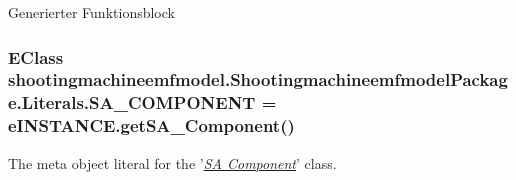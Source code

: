 Generierter Funktionsblock \hypertarget{interfaceshootingmachineemfmodel_1_1_shootingmachineemfmodel_package_1_1_literals_a02c09c502db1f3c903cbd6282befc333}{
\subsubsection[{S\-A\-\_\-\-C\-O\-M\-P\-O\-N\-E\-N\-T}]{\setlength{\rightskip}{0pt plus 5cm}E\-Class shootingmachineemfmodel.\-Shootingmachineemfmodel\-Package.\-Literals.\-S\-A\-\_\-\-C\-O\-M\-P\-O\-N\-E\-N\-T = e\-I\-N\-S\-T\-A\-N\-C\-E.\-get\-S\-A\-\_\-\-Component()}}\label{interfaceshootingmachineemfmodel_1_1_shootingmachineemfmodel_package_1_1_literals_a02c09c502db1f3c903cbd6282befc333}
The meta object literal for the '\hyperlink{classshootingmachineemfmodel_1_1impl_1_1_s_a___component_impl}{{\itshape S\-A Component}}' class.

